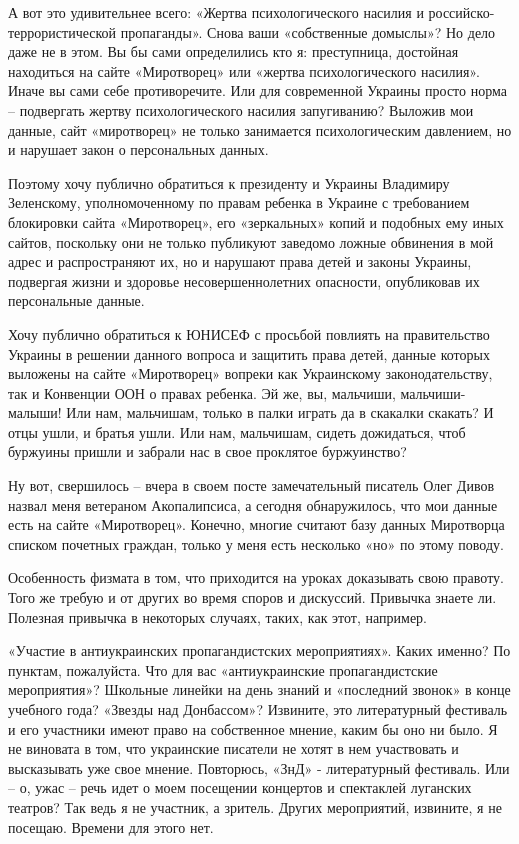А вот это удивительнее всего: «Жертва психологического насилия и
российско-террористической пропаганды». Снова ваши «собственные домыслы»? Но
дело даже не в этом. Вы бы сами определились кто я: преступница, достойная
находиться на сайте «Миротворец» или «жертва психологического насилия». Иначе
вы сами себе противоречите. Или для современной Украины просто норма –
подвергать жертву психологического насилия запугиванию? Выложив мои данные,
сайт «миротворец» не только занимается психологическим давлением, но и нарушает
закон о персональных данных.

Поэтому хочу публично обратиться к президенту и Украины Владимиру Зеленскому,
уполномоченному по правам ребенка в Украине с требованием блокировки сайта
«Миротворец», его «зеркальных» копий и подобных ему иных сайтов, поскольку они
не только публикуют заведомо ложные обвинения в мой адрес и распространяют их,
но и нарушают права детей и законы Украины, подвергая жизни и здоровье
несовершеннолетних опасности, опубликовав их персональные данные.

Хочу публично обратиться к ЮНИСЕФ с просьбой повлиять на правительство Украины
в решении данного вопроса и защитить права детей, данные которых выложены на
сайте «Миротворец» вопреки как Украинскому законодательству, так и Конвенции
ООН о правах ребенка. Эй же, вы, мальчиши, мальчиши-малыши! Или нам, мальчишам,
только в палки играть да в скакалки скакать? И отцы ушли, и братья ушли. Или
нам, мальчишам, сидеть дожидаться, чтоб буржуины пришли и забрали нас в свое
проклятое буржуинство?

Ну вот, свершилось – вчера в своем посте замечательный писатель Олег Дивов
назвал меня ветераном Акопалипсиса, а сегодня обнаружилось, что мои данные есть
на сайте «Миротворец». Конечно, многие считают базу данных Миротворца списком
почетных граждан, только у меня есть несколько «но» по этому поводу.

Особенность физмата в том, что приходится на уроках доказывать свою правоту.
Того же требую и от других во время споров и дискуссий. Привычка знаете ли.
Полезная привычка в некоторых случаях, таких, как этот, например.

«Участие в антиукраинских пропагандистских мероприятиях». Каких именно? По
пунктам, пожалуйста. Что для вас «антиукраинские пропагандистские мероприятия»?
Школьные линейки на день знаний и «последний звонок» в конце учебного года?
«Звезды над Донбассом»? Извините, это литературный фестиваль и его участники
имеют право на собственное мнение, каким бы оно ни было. Я не виновата в том,
что украинские писатели не хотят в нем участвовать и высказывать уже свое
мнение. Повторюсь, «ЗнД» - литературный фестиваль. Или – о, ужас – речь идет о
моем посещении концертов и спектаклей луганских театров? Так ведь я не
участник, а зритель. Других мероприятий, извините, я не посещаю. Времени для
этого нет.

